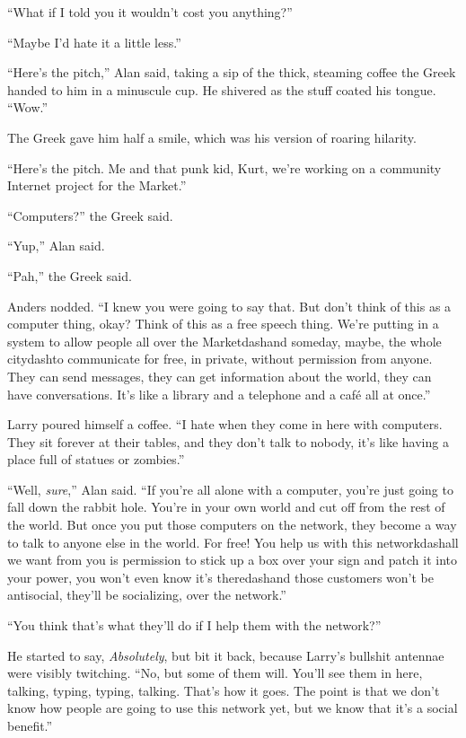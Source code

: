``What if I told you it wouldn't cost you anything?''

``Maybe I'd hate it a little less.''

``Here's the pitch,'' Alan said, taking a sip of the thick, steaming
coffee the Greek handed to him in a minuscule cup.  He shivered as the
stuff coated his tongue.  ``Wow.''

The Greek gave him half a smile, which was his version of roaring
hilarity.

``Here's the pitch.  Me and that punk kid, Kurt, we're working on a
community Internet project for the Market.''

``Computers?'' the Greek said.

``Yup,'' Alan said.

``Pah,'' the Greek said.

Anders nodded.  ``I knew you were going to say that.  But don't think
of this as a computer thing, okay?  Think of this as a free speech
thing.  We're putting in a system to allow people all over the
Marketdash{}and someday, maybe, the whole citydash{}to communicate for free,
in private, without permission from anyone.  They can send messages,
they can get information about the world, they can have conversations. 
It's like a library and a telephone and a caf\'{e} all at once.''

Larry poured himself a coffee.  ``I hate when they come in here with
computers.  They sit forever at their tables, and they don't talk to
nobody, it's like having a place full of statues or zombies.''

``Well, \textit{sure},'' Alan said.  ``If you're all alone with a
computer, you're just going to fall down the rabbit hole.  You're in
your own world and cut off from the rest of the world.  But once you
put those computers on the network, they become a way to talk to
anyone else in the world.  For free!  You help us with this
networkdash{}all we want from you is permission to stick up a box over
your sign and patch it into your power, you won't even know it's
theredash{}and those customers won't be antisocial, they'll be
socializing, over the network.''

``You think that's what they'll do if I help them with the network?''

He started to say, \textit{Absolutely}, but bit it back, because
Larry's bullshit antennae were visibly twitching.  ``No, but some of
them will.  You'll see them in here, talking, typing, typing, talking. 
That's how it goes.  The point is that we don't know how people are
going to use this network yet, but we know that it's a social
benefit.''

